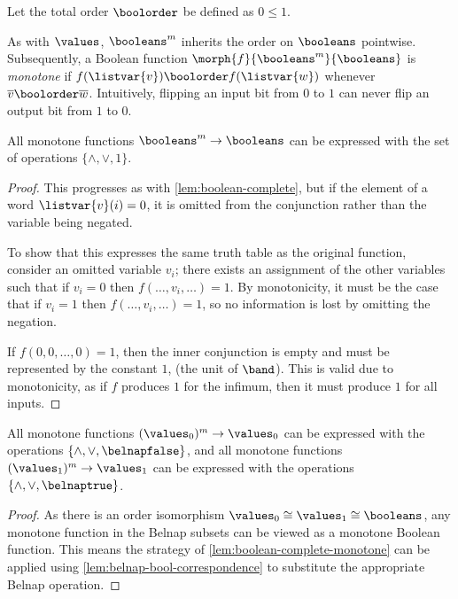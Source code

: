 \begin{definition}
    Let the total order \(\boolorder\) be defined as \(0 \leq 1\).
\end{definition}

As with \(\values\), \(\booleans^m\) inherits the order on \(\booleans\)
pointwise.
Subsequently, a Boolean function \(\morph{f}{\booleans^m}{\booleans}\) is
\emph{monotone} if \(f(\listvar{v}) \boolorder f(\listvar{w})\) whenever
\(\overline{v} \boolorder \overline{w}\).
Intuitively, flipping an input bit from \(0\) to \(1\) can never flip an output
bit from \(1\) to \(0\).

\begin{lemma}
    \label{lem:boolean-complete-monotone}
    All monotone functions \(\booleans^m \to \booleans\) can be expressed with
    the set of operations \(\{\land,\lor,1\}\).
\end{lemma}
\begin{proof}
    This progresses as with \cref{lem:boolean-complete}, but if the element of
    a word \(\listvar{v}(i) = 0\), it is omitted from the conjunction
    rather than the variable being negated.

    To show that this expresses the same truth table as the original function,
    consider an omitted variable \(v_i\); there exists an assignment of the
    other variables such that if \(v_i = 0\) then \(f(\dots, v_i, \dots) = 1\).
    By monotonicity, it must be the case that if \(v_i = 1\) then
    \(f(\dots, v_i, \dots) = 1\), so no information is lost by omitting
    the negation.

    If \(f(0, 0, \dots, 0) = 1\), then the inner conjunction is empty and must
    be represented by the constant \(1\), (the unit of \(\band\)).
    This is valid due to monotonicity, as if \(f\) produces \(1\) for the
    infimum, then it must produce \(1\) for all inputs.
\end{proof}

\begin{corollary}\label{cor:func-complete-falsy-truthy}
    All monotone functions \((\values_0)^m \to \values_0\) can be expressed
    with the operations \(\{\land,\lor,\belnapfalse\}\), and all monotone
    functions \((\values_1)^m \to \values_1\) can be expressed with the
    operations \(\{\land,\lor,\belnaptrue\}\).
\end{corollary}
\begin{proof}
    As there is an order isomorphism
    \(\values_0 \cong \values_1 \cong \booleans\), any monotone function in
    the Belnap subsets can be viewed as a monotone Boolean function.
    This means the strategy of \cref{lem:boolean-complete-monotone} can
    be applied using \cref{lem:belnap-bool-correspondence} to substitute the
    appropriate Belnap operation.
\end{proof}

